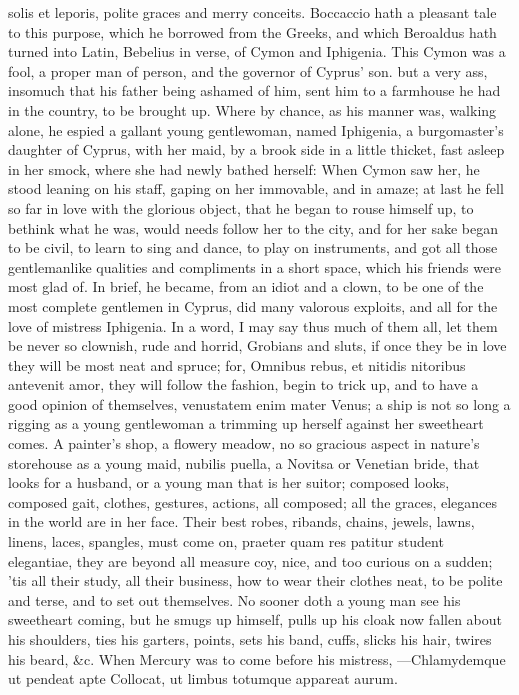 {solis et leporis, polite graces and merry conceits. Boccaccio hath a
pleasant tale to this purpose, which he borrowed from the Greeks, and
which Beroaldus hath turned into Latin, Bebelius in verse, of Cymon and
Iphigenia. This Cymon was a fool, a proper man of person, and the
governor of Cyprus' son. but a very ass, insomuch that his father being
ashamed of him, sent him to a farmhouse he had in the country, to be
brought up. Where by chance, as his manner was, walking alone, he
espied a gallant young gentlewoman, named Iphigenia, a burgomaster's
daughter of Cyprus, with her maid, by a brook side in a little thicket,
fast asleep in her smock, where she had newly bathed herself: When
Cymon saw her, he stood leaning on his staff, gaping on her
immovable, and in amaze; at last he fell so far in love with the
glorious object, that he began to rouse himself up, to bethink what he
was, would needs follow her to the city, and for her sake began to be
civil, to learn to sing and dance, to play on instruments, and got all
those gentlemanlike qualities and compliments in a short space, which
his friends were most glad of. In brief, he became, from an idiot and a
clown, to be one of the most complete gentlemen in Cyprus, did many
valorous exploits, and all for the love of mistress Iphigenia. In a
word, I may say thus much of them all, let them be never so clownish,
rude and horrid, Grobians and sluts, if once they be in love they will
be most neat and spruce; for, Omnibus rebus, et nitidis nitoribus
antevenit amor, they will follow the fashion, begin to trick up, and to
have a good opinion of themselves, venustatem enim mater Venus; a ship
is not so long a rigging as a young gentlewoman a trimming up herself
against her sweetheart comes. A painter's shop, a flowery meadow, no so
gracious aspect in nature's storehouse as a young maid, nubilis puella,
a Novitsa or Venetian bride, that looks for a husband, or a young man
that is her suitor; composed looks, composed gait, clothes, gestures,
actions, all composed; all the graces, elegances in the world are in
her face. Their best robes, ribands, chains, jewels, lawns, linens,
laces, spangles, must come on, praeter quam res patitur student
elegantiae, they are beyond all measure coy, nice, and too curious on a
sudden; 'tis all their study, all their business, how to wear their
clothes neat, to be polite and terse, and to set out themselves. No
sooner doth a young man see his sweetheart coming, but he smugs up
himself, pulls up his cloak now fallen about his shoulders, ties his
garters, points, sets his band, cuffs, slicks his hair, twires his
beard, \&c. When Mercury was to come before his mistress,
---Chlamydemque ut pendeat apte
Collocat, ut limbus totumque appareat aurum.

}
